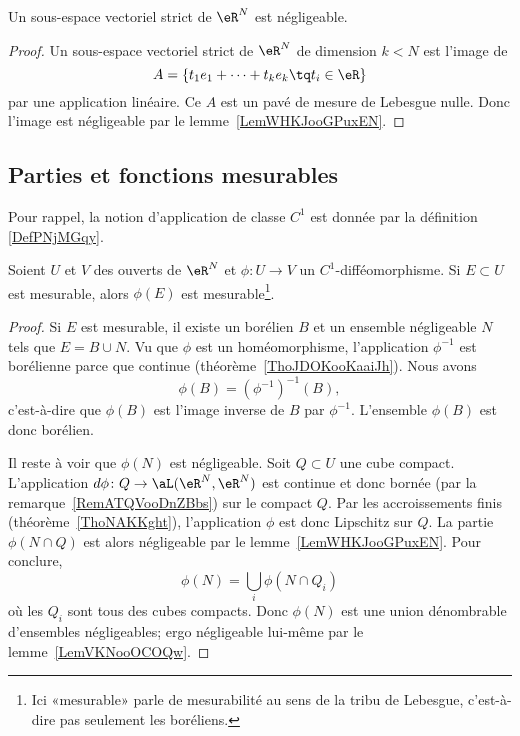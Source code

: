 \begin{corollary}
	Un sous-espace vectoriel strict de \( \eR^N\) est négligeable.
\end{corollary}

\begin{proof}
	Un sous-espace vectoriel strict de \( \eR^N\) de dimension \( k<N\) est l'image de
	\begin{equation}
		A=\{ t_1e_1+\cdots +t_ke_k\tq t_i\in \eR \}
	\end{equation}
	par une application linéaire. Ce \( A\) est un pavé de mesure de Lebesgue nulle. Donc l'image est négligeable par le lemme~\ref{LemWHKJooGPuxEN}.
\end{proof}

\subsection{Parties et fonctions mesurables}

Pour rappel, la notion d'application de classe \( C^1\) est donnée par la définition \ref{DefPNjMGqy}.

\begin{proposition}     \label{PropRDRNooFnZSKt}
	Soient \( U\) et \( V\) des ouverts de \( \eR^N\) et \( \phi\colon U\to V\) un \( C^1\)-difféomorphisme. Si \( E\subset U\) est mesurable, alors \( \phi(E)\) est mesurable\footnote{Ici «mesurable» parle de mesurabilité au sens de la tribu de Lebesgue, c'est-à-dire pas seulement les boréliens.}.
\end{proposition}

\begin{proof}
	Si \( E\) est mesurable, il existe un borélien \( B\) et un ensemble négligeable \( N\) tels que \( E=B\cup N\). Vu que \( \phi\) est un homéomorphisme, l'application \( \phi^{-1}\) est borélienne parce que continue (théorème~\ref{ThoJDOKooKaaiJh}). Nous avons
	\begin{equation}
		\phi(B)=(\phi^{-1})^{-1}(B),
	\end{equation}
	c'est-à-dire que \( \phi(B)\) est l'image inverse de \( B\) par \( \phi^{-1}\). L'ensemble \( \phi(B)\) est donc borélien.

	Il reste à voir que \( \phi(N)\) est négligeable. Soit \( Q\subset U\) une cube compact. L'application \( d\phi\colon Q\to \aL(\eR^N,\eR^N)\) est continue et donc bornée (par la remarque~\ref{RemATQVooDnZBbs}) sur le compact \( Q\). Par les accroissements finis (théorème~\ref{ThoNAKKght}), l'application \( \phi\) est donc Lipschitz sur \( Q\). La partie \( \phi(N\cap Q)\) est alors négligeable par le lemme~\ref{LemWHKJooGPuxEN}. Pour conclure,
	\begin{equation}
		\phi(N)=\bigcup_i\phi(N\cap Q_i)
	\end{equation}
	où les \( Q_i\) sont tous des cubes compacts. Donc \( \phi(N)\) est une union dénombrable d'ensembles négligeables; ergo négligeable lui-même par le lemme~\ref{LemVKNooOCOQw}.
\end{proof}

